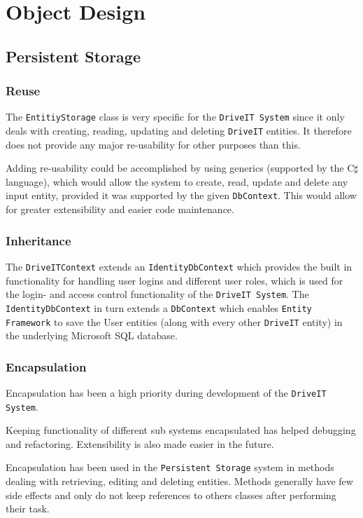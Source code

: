 \section{Object Design}

\subsection{Persistent Storage}

\subsubsection{Reuse}
The \texttt{EntitiyStorage} class is very specific for the \texttt{DriveIT System} since it only deals with creating, reading, updating and deleting \texttt{DriveIT} entities. It therefore does not provide any major re-usability for other purposes than this. 

Adding re-usability could be accomplished by using generics (supported by the C$\sharp$ language), which would allow the system to create, read, update and delete any input entity, provided it was supported by the given \texttt{DbContext}. This would allow for greater extensibility and easier code maintenance.

\subsubsection{Inheritance}
The \texttt{DriveITContext} extends an \texttt{IdentityDbContext} which provides the built in functionality for handling user logins and different user roles, which is used for the login- and access control functionality of the \texttt{DriveIT System}.
The \texttt{IdentityDbContext} in turn extends a \texttt{DbContext} which enables \texttt{Entity Framework} to save the User entities (along with every other \texttt{DriveIT} entity) in the underlying Microsoft SQL database.

\subsubsection{Encapsulation}
Encapsulation has been a high priority during development of the \texttt{DriveIT System}. 

Keeping functionality of different sub systems encapsulated has helped debugging and refactoring. Extensibility is also made easier in the future.

Encapsulation has been used in the \texttt{Persistent Storage} system in methods dealing with retrieving, editing and deleting entities. Methods generally have few side effects and only do not keep references to others classes after performing their task.

